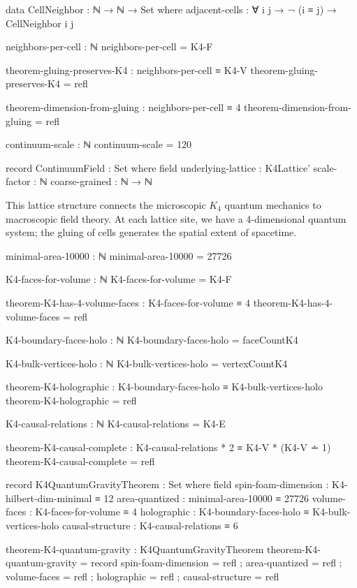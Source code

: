 \documentclass[11pt,a4paper]{book}
\begin{document}
\begin{code}
data CellNeighbor : ℕ → ℕ → Set where
  adjacent-cells : ∀ i j → ¬ (i ≡ j) → CellNeighbor i j

neighbors-per-cell : ℕ
neighbors-per-cell = K4-F

theorem-gluing-preserves-K4 : neighbors-per-cell ≡ K4-V
theorem-gluing-preserves-K4 = refl

theorem-dimension-from-gluing : neighbors-per-cell ≡ 4
theorem-dimension-from-gluing = refl

continuum-scale : ℕ
continuum-scale = 120

record ContinuumField : Set where
  field
    underlying-lattice : K4Lattice'
    scale-factor : ℕ
    coarse-grained : ℕ → ℕ
\end{code}

This lattice structure connects the microscopic $K_4$ quantum mechanics
to macroscopic field theory. At each lattice site, we have a 4-dimensional
quantum system; the gluing of cells generates the spatial extent of spacetime.

\begin{code}
minimal-area-10000 : ℕ
minimal-area-10000 = 27726

K4-faces-for-volume : ℕ
K4-faces-for-volume = K4-F

theorem-K4-has-4-volume-faces : K4-faces-for-volume ≡ 4
theorem-K4-has-4-volume-faces = refl
\end{code}

\begin{code}
K4-boundary-faces-holo : ℕ
K4-boundary-faces-holo = faceCountK4

K4-bulk-vertices-holo : ℕ
K4-bulk-vertices-holo = vertexCountK4

theorem-K4-holographic : K4-boundary-faces-holo ≡ K4-bulk-vertices-holo
theorem-K4-holographic = refl
\end{code}

\begin{code}
K4-causal-relations : ℕ
K4-causal-relations = K4-E

theorem-K4-causal-complete : K4-causal-relations * 2 ≡ K4-V * (K4-V ∸ 1)
theorem-K4-causal-complete = refl
\end{code}

\begin{code}
record K4QuantumGravityTheorem : Set where
  field
    spin-foam-dimension : K4-hilbert-dim-minimal ≡ 12
    area-quantized      : minimal-area-10000 ≡ 27726
    volume-faces        : K4-faces-for-volume ≡ 4
    holographic         : K4-boundary-faces-holo ≡ K4-bulk-vertices-holo
    causal-structure    : K4-causal-relations ≡ 6

theorem-K4-quantum-gravity : K4QuantumGravityTheorem
theorem-K4-quantum-gravity = record
  { spin-foam-dimension = refl
  ; area-quantized      = refl
  ; volume-faces        = refl
  ; holographic         = refl
  ; causal-structure    = refl
  }
\end{code}
\end{document}
